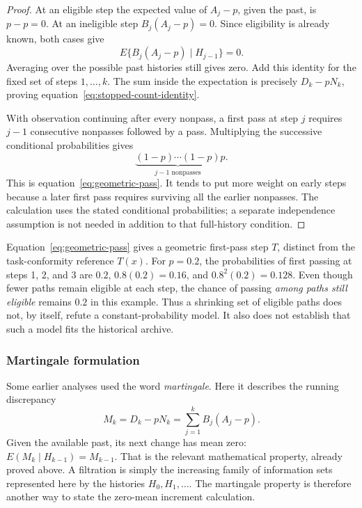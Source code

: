 \begin{proof}
At an eligible step the expected value of $A_j-p$, given the past, is $p-p=0$. At an ineligible step $B_j(A_j-p)=0$. Since eligibility is already known, both cases give
\[
 E\{B_j(A_j-p)\mid H_{j-1}\}=0.
\]
Averaging over the possible past histories still gives zero. Add this identity for the fixed set of steps $1,\ldots,k$. The sum inside the expectation is precisely $D_k-pN_k$, proving equation~\eqref{eq:stopped-count-identity}.

With observation continuing after every nonpass, a first pass at step $j$ requires $j-1$ consecutive nonpasses followed by a pass. Multiplying the successive conditional probabilities gives
\[
 \underbrace{(1-p)\cdots(1-p)}_{j-1\text{ nonpasses}}p.
\]
This is equation~\eqref{eq:geometric-pass}. It tends to put more weight on early steps because a later first pass requires surviving all the earlier nonpasses. The calculation uses the stated conditional probabilities; a separate independence assumption is not needed in addition to that full-history condition.
\end{proof}

Equation~\eqref{eq:geometric-pass} gives a geometric first-pass step $T$, distinct from the task-conformity reference $T(x)$. For $p=0.2$, the probabilities of first passing at steps 1, 2, and 3 are $0.2$, $0.8(0.2)=0.16$, and $0.8^2(0.2)=0.128$. Even though fewer paths remain eligible at each step, the chance of passing \emph{among paths still eligible} remains $0.2$ in this example. Thus a shrinking set of eligible paths does not, by itself, refute a constant-probability model. It also does not establish that such a model fits the historical archive.

\subsubsection{Martingale formulation}
\label{subsec:martingale}
Some earlier analyses used the word \emph{martingale}. Here it describes the running discrepancy
\[
 M_k=D_k-pN_k=\sum_{j=1}^k B_j(A_j-p).
\]
Given the available past, its next change has mean zero: $E(M_k\mid H_{k-1})=M_{k-1}$. That is the relevant mathematical property, already proved above. A filtration is simply the increasing family of information sets represented here by the histories $H_0,H_1,\ldots$. The martingale property is therefore another way to state the zero-mean increment calculation.

